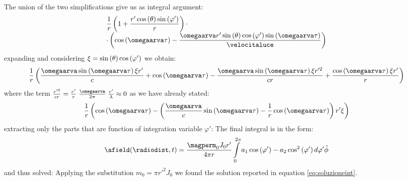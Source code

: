 The union of the two simplifications give us as integral argument:
\[\begin{array}{l}
\dfrac{1}{r}\braces{1+\dfrac{r' \ccos{\theta} \ssin{\varphi'}}{r}} \cdot \\
\cdot \braces{\ccos{\omegaarva\tau} - \dfrac{\omegaarva r' \ssin{\theta} \ccos{\varphi'}\ssin{\omegaarva\tau}}{\velocitaluce}}
\end{array}\]
expanding and considering $\xi = \sin\left( \theta \right)\cos\left( \varphi' \right)$ we obtain:
\[
\dfrac{1}{r} \braces{ \dfrac{\omegaarva\ssin{\omegaarva\tau}\xi r'}{c} + \ccos{\omegaarva\tau} - \dfrac{\omegaarva\ssin{\omegaarva\tau}\xi r'^2}{cr} + \dfrac{\ccos{\omegaarva\tau}\xi r'}{r} }
\]
where the term $\frac{r'^2}{cr} = \frac{r'}{r}\;\frac{\omegaarva}{2\pi}\;\frac{r'}{\lambda} \approx 0$ as we have already stated:
\[
\dfrac{1}{r} \braces{ \ccos{\omegaarva\tau} -\braces{\dfrac{\omegaarva}{c}\ssin{\omegaarva\tau} - \dfrac{1}{r}\ccos{\omegaarva\tau}}r'\xi}
\]
extracting only the parts that are function of integration variable $\varphi'$:
The final integral is in the form:
\[
\afield(\radiodist,t) = \dfrac{\magperm_0 J_0 r'}{4\pi r} \int\limits_{0}^{2\pi}a_1 \ccos{\varphi'} - a_2 \cos^2\braces{\varphi'} d\varphi' \hat{\phi}
\]
and thus solved:
Applying the substitution $m_0 = \pi r'^2 J_0$ we found the solution reported in equation \ref{eq:soluzioneint}.
